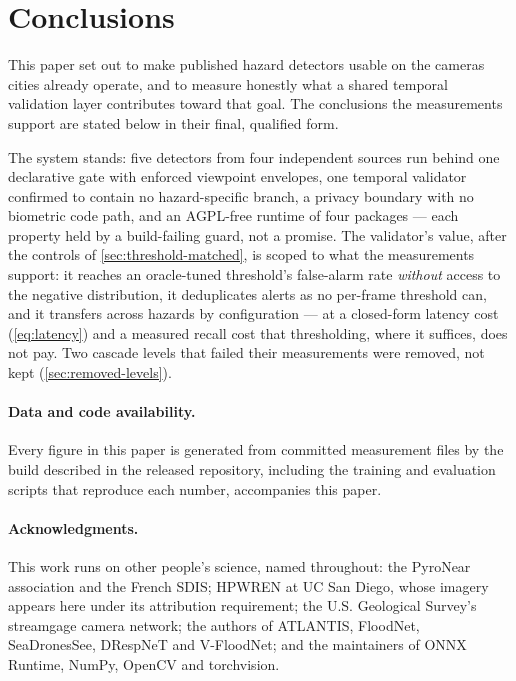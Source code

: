 \section{Conclusions}
\label{sec:conclusion}

This paper set out to make published hazard detectors usable on the cameras
cities already operate, and to measure honestly what a shared temporal
validation layer contributes toward that goal. The conclusions the
measurements support are stated below in their final, qualified form.

The system stands: five detectors from four independent sources run behind
one declarative gate with enforced viewpoint envelopes, one temporal
validator confirmed to contain no hazard-specific branch, a privacy boundary
with no biometric code path, and an AGPL-free runtime of four packages —
each property held by a build-failing guard, not a promise. The
validator's value, after the controls of \cref{sec:threshold-matched}, is
scoped to what the measurements support: it reaches an oracle-tuned
threshold's false-alarm rate \emph{without} access to the negative
distribution, it deduplicates alerts as no per-frame threshold can, and it
transfers across hazards by configuration — at a closed-form latency cost
(\cref{eq:latency}) and a measured recall cost that thresholding, where it
suffices, does not pay. Two cascade levels that failed their measurements
were removed, not kept (\cref{sec:removed-levels}).
\paragraph{Data and code availability.} Every figure in this paper is
generated from committed measurement files by the build described in
the released repository, including the training and
evaluation scripts that reproduce each number, accompanies this paper.

\paragraph{Acknowledgments.} This work runs on other people's science, named
throughout: the PyroNear association and the
French SDIS; HPWREN at UC San Diego, whose imagery appears here under its
attribution requirement; the U.S. Geological Survey's streamgage camera
network; the authors of ATLANTIS, FloodNet, SeaDronesSee, DRespNeT and
V-FloodNet; and the maintainers of ONNX Runtime, NumPy, OpenCV and
torchvision.
